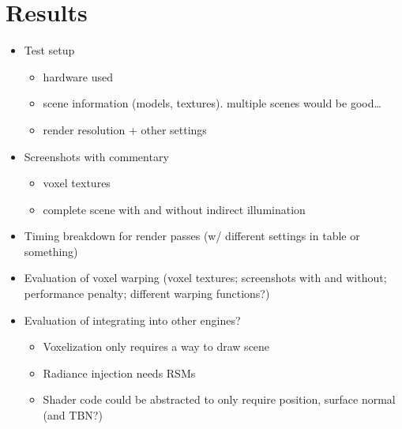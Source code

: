 \chapter{Results}

\begin{itemize}
    \item Test setup
    \begin{itemize}
        \item hardware used
        \item scene information (models, textures). multiple scenes would be good\ldots
        \item render resolution + other settings
    \end{itemize}
    \item Screenshots with commentary
    \begin{itemize}
        \item voxel textures
        \item complete scene with and without indirect illumination
    \end{itemize}
    \item Timing breakdown for render passes (w/ different settings in table or something)
    \item Evaluation of voxel warping (voxel textures; screenshots with and without; performance penalty; different warping functions?)
    \item Evaluation of integrating into other engines?
    \begin{itemize}
        \item Voxelization only requires a way to draw scene
        \item Radiance injection needs RSMs
        \item Shader code could be abstracted to only require position, surface normal (and TBN?)
    \end{itemize}
\end{itemize}

